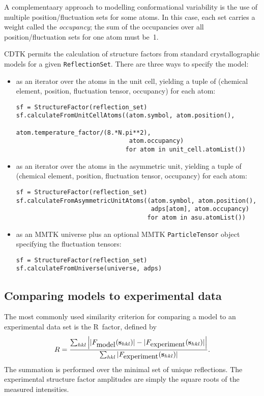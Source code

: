 \documentclass[12pt]{article}
\newcommand{\vect}[1]{{\bf #1}}
\newcommand{\vs}{\vect{s}}
\begin{document}
\begin{sloppy}
A complementaary approach to modelling conformational variability is
the use of multiple position/fluctuation sets for some atoms. In this
case, each set carries a weight called the \textit{occupancy}; the sum
of the occupancies over all position/fluctuation sets for one atom
must be~1.

\vspace{3mm}

CDTK permits the calculation of structure factors from standard
crystallographic models for a given \texttt{ReflectionSet}.
There are three ways to specify the model:
\begin{itemize}
\item
as an iterator over the atoms in the unit cell, yielding a tuple
of (chemical element, position, fluctuation tensor, occupancy)
for each atom:
{\small
\begin{verbatim}
sf = StructureFactor(reflection_set)
sf.calculateFromUnitCellAtoms((atom.symbol, atom.position(),
                               atom.temperature_factor/(8.*N.pi**2),
                               atom.occupancy)
                              for atom in unit_cell.atomList())
\end{verbatim}
}
\item
as an iterator over the atoms in the asymmetric unit, yielding a tuple
of (chemical element, position, fluctuation tensor, occupancy)
for each atom:
{\small
\begin{verbatim}
sf = StructureFactor(reflection_set)
sf.calculateFromAsymmetricUnitAtoms((atom.symbol, atom.position(),
                                     adps[atom], atom.occupancy)
                                    for atom in asu.atomList())
\end{verbatim}
}
\item
as an MMTK universe plus an optional MMTK \texttt{ParticleTensor} object
specifying the fluctuation tensors:
{\small
\begin{verbatim}
sf = StructureFactor(reflection_set)
sf.calculateFromUniverse(universe, adps)
\end{verbatim}
}
\end{itemize}

\subsection{Comparing models to experimental data}

The most commonly used similarity criterion for comparing a model
to an experimental data set is the R~factor, defined by
\begin{equation}
R = \frac{\sum_{hkl}
    \left| |F_{\mbox{model}}(\vs_{hkl})|-|F_{\mbox{experiment}}(\vs_{hkl})| \right|}
    {\sum_{hkl} |F_{\mbox{experiment}}(\vs_{hkl})|}.
\end{equation}
The summation is performed over the minimal set of unique reflections.
The experimental structure factor amplitudes are simply the square roots
of the measured intensities.


\end{sloppy}
\end{document}
